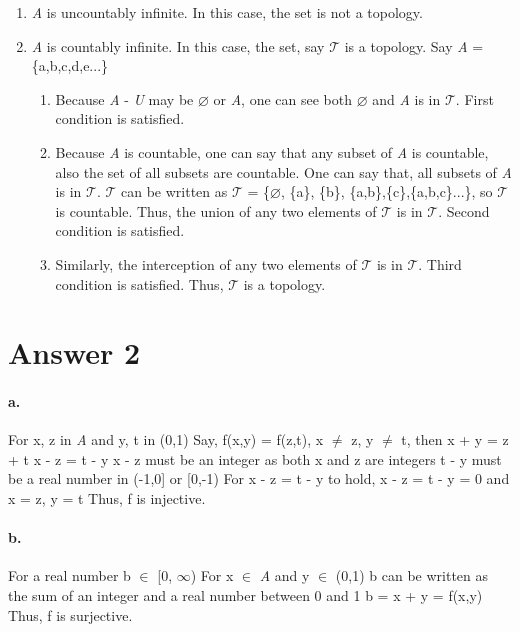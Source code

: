 \documentclass[11pt]{article}
\begin{document}
\begin{enumerate}
\begin{enumerate}
        \item \emph{A} is uncountably infinite. In this case, the set is not a topology.
        \item \emph{A} is countably infinite. In this case, the set, say $\mathcal{T}$ is a topology. Say \emph{A} = \{a,b,c,d,e...\}
        \begin{enumerate}
            \item Because \emph{A} - \emph{U} may be $\varnothing$ or \emph{A}, one can see both $\varnothing$ and \emph{A} is in $\mathcal{T}$. First condition is satisfied.
            \item Because \emph{A} is countable, one can say that any subset of \emph{A} is countable, also the set of all subsets are countable. One can say that, all subsets of \emph{A} is in $\mathcal{T}$. $\mathcal{T}$ can be written as $\mathcal{T}$ = \{$\varnothing$, \{a\}, \{b\}, \{a,b\},\{c\},\{a,b,c\}...\}, so $\mathcal{T}$ is countable. Thus, the union of any two elements of $\mathcal{T}$ is in $\mathcal{T}$. Second condition is satisfied.
            \item Similarly, the interception of any two elements of $\mathcal{T}$ is in $\mathcal{T}$. Third condition is satisfied. Thus, $\mathcal{T}$ is a topology.
        \end{enumerate}
    \end{enumerate}
\end{enumerate}
\newpage
\section*{Answer 2}
\paragraph{a.} For x, z in \emph{A} and y, t in (0,1) \newline \newline
Say, f(x,y) = f(z,t), x $\neq$ z, y $\neq$ t, then \newline
x + y = z + t \newline
x - z = t - y \newline
x - z must be an integer as both x and z are integers \newline
t - y must be a real number in (-1,0] or [0,-1) \newline
For x - z = t - y to hold, x - z = t - y = 0 and x = z, y = t \newline
Thus, f is injective.
\paragraph{b.} For a real number b $\in$ [0, $\infty$) \newline \newline
For x $\in$ \emph{A} and y $\in$ (0,1) \newline
b can be written as the sum of an integer and a real number between 0 and 1 b = x + y = f(x,y)\newline
Thus, f is surjective.
\end{document}
